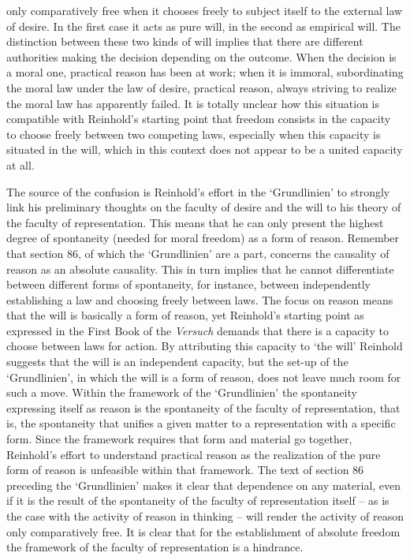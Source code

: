 only comparatively free when it chooses freely to subject itself to the external law of desire. In the first case it acts as pure will, in the second as empirical will. The distinction between these two kinds of will implies that there are different authorities making the decision depending on the outcome. When the decision is a moral one, practical reason has been at work; when it is immoral, subordinating the moral law under the law of desire, practical reason, always striving to realize the moral law has apparently failed. It is totally unclear how this situation is compatible with Reinhold's starting point that freedom consists in the capacity to choose freely between two competing laws, especially when this capacity is situated in the will, which in this context does not appear to be a united capacity at all. 

 The source of the confusion is Reinhold's effort in the `Grundlinien' to strongly link his preliminary thoughts on the faculty of desire and the will to his theory of the faculty of representation. This means that he can only present the highest degree of spontaneity (needed for moral freedom) as a form of reason. Remember that section 86, of which the `Grundlinien' are a part, concerns the causality of reason as an absolute causality. This in turn implies that he cannot differentiate between different forms of spontaneity, for instance, between independently establishing a law and choosing freely between laws. The focus on reason means that the will is basically a form of reason, yet Reinhold's starting point as expressed in the First Book of the \textit{Versuch} demands that there is a capacity to choose between laws for action. By attributing this capacity to `the will' Reinhold suggests that the will is an independent capacity, but the set{-}up of the `Grundlinien', in which the will is a form of reason, does not leave much room for such a move. Within the framework of the `Grundlinien' the spontaneity expressing itself as reason is the spontaneity of the faculty of representation, that is, the spontaneity that unifies a given matter to a representation with a specific form. Since the framework requires that form and material go together, Reinhold's effort to understand practical reason as the realization of the pure form of reason is unfeasible within that framework. The text of section 86 preceding the `Grundlinien' makes it clear that dependence on any material, even if it is the result of the spontaneity of the faculty of representation itself {--} as is the case with the activity of reason in thinking {--} will render the activity of reason only comparatively free. It is clear that for the establishment of absolute freedom the framework of the faculty of representation is a hindrance. 

